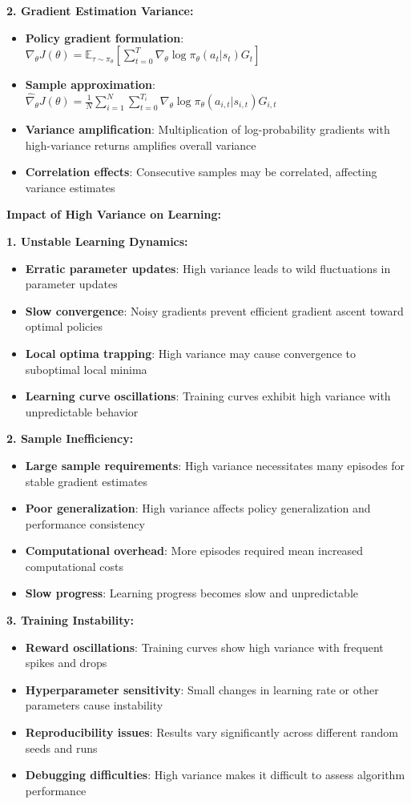 \documentclass[12pt]{article}
\begin{document}
{{{\textbf{2. Gradient Estimation Variance:}
\begin{itemize}
    \item \textbf{Policy gradient formulation}: $\nabla_\theta J(\theta) = \mathbb{E}_{\tau \sim \pi_\theta}[\sum_{t=0}^{T} \nabla_\theta \log \pi_\theta(a_t|s_t) G_t]$
    \item \textbf{Sample approximation}: $\hat{\nabla}_\theta J(\theta) = \frac{1}{N} \sum_{i=1}^{N} \sum_{t=0}^{T_i} \nabla_\theta \log \pi_\theta(a_{i,t}|s_{i,t}) G_{i,t}$
    \item \textbf{Variance amplification}: Multiplication of log-probability gradients with high-variance returns amplifies overall variance
    \item \textbf{Correlation effects}: Consecutive samples may be correlated, affecting variance estimates
\end{itemize}

\textbf{Impact of High Variance on Learning:}

\textbf{1. Unstable Learning Dynamics:}
\begin{itemize}
    \item \textbf{Erratic parameter updates}: High variance leads to wild fluctuations in parameter updates
    \item \textbf{Slow convergence}: Noisy gradients prevent efficient gradient ascent toward optimal policies
    \item \textbf{Local optima trapping}: High variance may cause convergence to suboptimal local minima
    \item \textbf{Learning curve oscillations}: Training curves exhibit high variance with unpredictable behavior
\end{itemize}

\textbf{2. Sample Inefficiency:}
\begin{itemize}
    \item \textbf{Large sample requirements}: High variance necessitates many episodes for stable gradient estimates
    \item \textbf{Poor generalization}: High variance affects policy generalization and performance consistency
    \item \textbf{Computational overhead}: More episodes required mean increased computational costs
    \item \textbf{Slow progress}: Learning progress becomes slow and unpredictable
\end{itemize}

\textbf{3. Training Instability:}
\begin{itemize}
    \item \textbf{Reward oscillations}: Training curves show high variance with frequent spikes and drops
    \item \textbf{Hyperparameter sensitivity}: Small changes in learning rate or other parameters cause instability
    \item \textbf{Reproducibility issues}: Results vary significantly across different random seeds and runs
    \item \textbf{Debugging difficulties}: High variance makes it difficult to assess algorithm performance
\end{itemize}

}}}
\end{document}

